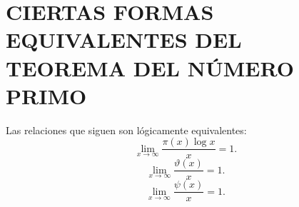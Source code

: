 \documentclass[12pt,a4paper]{book}
\begin{document}
    \section{CIERTAS FORMAS EQUIVALENTES DEL TEOREMA DEL NÚMERO PRIMO}

    \begin{teorema}
        Las relaciones que siguen son lógicamente equivalentes:
        \begin{equation}
            \lim_{x\to\infty}\frac{\pi(x)\log x}{x}=1.
        \end{equation}
        \begin{equation}
            \lim_{x\to\infty}\frac{\vartheta(x)}{x}=1.
        \end{equation}
        \begin{equation}
            \lim_{x\to\infty}\frac{\psi(x)}{x}=1.
        \end{equation}
    \end{teorema}
\end{document}
